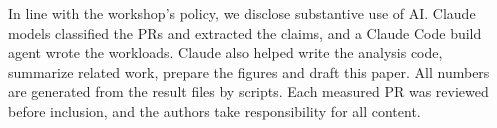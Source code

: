 In line with the workshop's policy, we disclose substantive use of AI.
Claude models classified the PRs and extracted the claims, and a Claude
Code build agent wrote the workloads. Claude also helped write the
analysis code, summarize related work, prepare the figures and draft this
paper. All numbers are generated from the result files by scripts. Each
measured PR was reviewed before inclusion, and the authors take
responsibility for all content.

